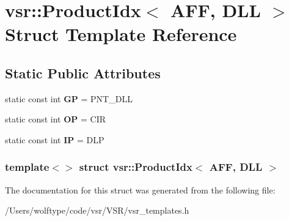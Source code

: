 \hypertarget{structvsr_1_1_product_idx_3_01_a_f_f_00_01_d_l_l_01_4}{\section{vsr\-:\-:Product\-Idx$<$ A\-F\-F, D\-L\-L $>$ Struct Template Reference}
\label{structvsr_1_1_product_idx_3_01_a_f_f_00_01_d_l_l_01_4}
}
\subsection*{Static Public Attributes}
\begin{DoxyCompactItemize}
\item 
\hypertarget{structvsr_1_1_product_idx_3_01_a_f_f_00_01_d_l_l_01_4_a19f08838641eec14359e1812faaf553d}{static const int {\bfseries G\-P} = P\-N\-T\-\_\-\-D\-L\-L}\label{structvsr_1_1_product_idx_3_01_a_f_f_00_01_d_l_l_01_4_a19f08838641eec14359e1812faaf553d}

\item 
\hypertarget{structvsr_1_1_product_idx_3_01_a_f_f_00_01_d_l_l_01_4_ac6db420530de8ec8ca1b12f1963fab85}{static const int {\bfseries O\-P} = C\-I\-R}\label{structvsr_1_1_product_idx_3_01_a_f_f_00_01_d_l_l_01_4_ac6db420530de8ec8ca1b12f1963fab85}

\item 
\hypertarget{structvsr_1_1_product_idx_3_01_a_f_f_00_01_d_l_l_01_4_aa3baf81d55c4d7945bcba191e8d12122}{static const int {\bfseries I\-P} = D\-L\-P}\label{structvsr_1_1_product_idx_3_01_a_f_f_00_01_d_l_l_01_4_aa3baf81d55c4d7945bcba191e8d12122}

\end{DoxyCompactItemize}
\subsubsection*{template$<$$>$ struct vsr\-::\-Product\-Idx$<$ A\-F\-F, D\-L\-L $>$}



The documentation for this struct was generated from the following file\-:\begin{DoxyCompactItemize}
\item 
/\-Users/wolftype/code/vsr/\-V\-S\-R/vsr\-\_\-templates.\-h\end{DoxyCompactItemize}
